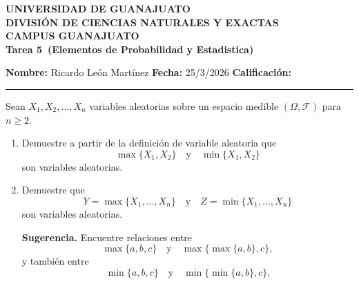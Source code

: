 \documentclass[12pt,a4paper]{article}
\newcommand{\alumno}{Ricardo León Martínez}
\newcommand{\materia}{Elementos de Probabilidad y Estadistica}
\newcommand{\tarea}{Tarea 5}
\newcommand{\fecha}{25/3/2026}
\begin{document}
    \begin{center}
        {\large\textbf{UNIVERSIDAD DE GUANAJUATO}}\\[0.3cm]
        {\normalsize\textbf{DIVISIÓN DE CIENCIAS NATURALES Y EXACTAS}}\\
        {\normalsize\textbf{CAMPUS GUANAJUATO}}\\[1cm]

        {\Large\textbf{\tarea\ (\materia)}}\\[1cm]
    \end{center}

    \noindent
    \textbf{Nombre:} \alumno 
    \hfill 
    \textbf{Fecha:} \fecha 
    \hfill 
    \textbf{Calificación:} \rule{3cm}{0.4pt}

    \vspace{0.3cm}

    \begin{mdframed}[style=mdpinkbox,frametitle={Ejercicio 1}]
    Sean $X_{1},X_{2},\ldots,X_{n}$ variables aleatorias sobre un espacio medible $(\Omega,\mathcal{F})$ para $n\geq 2$.
        \begin{enumerate}
            \item[(a)] Demuestre a partir de la definición de variable aleatoria que
            \[
            \max\{X_{1},X_{2}\}
            \quad \text{y} \quad
            \min\{X_{1},X_{2}\}
            \]
            son variables aleatorias.

            \item[(b)] Demuestre que
            \[
            Y=\max\{X_{1},\ldots,X_{n}\}
            \quad \text{y} \quad
            Z=\min\{X_{1},\ldots,X_{n}\}
            \]
            son variables aleatorias.

            \textbf{Sugerencia.} Encuentre relaciones entre
            \[
            \max\{a,b,c\}
            \quad \text{y} \quad
            \max\{\max\{a,b\},c\},
            \]
            y también entre
            \[
            \min\{a,b,c\}
            \quad \text{y} \quad
            \min\{\min\{a,b\},c\}.
            \]
        \end{enumerate}
    \end{mdframed}
\end{document}

